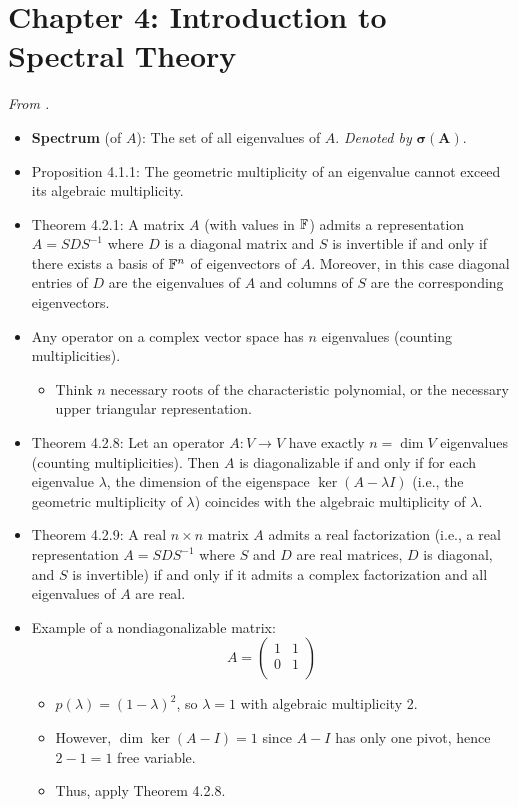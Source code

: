 \documentclass[../../notes.tex]{subfiles}
\begin{document}
\section{Chapter 4: Introduction to Spectral Theory}
\emph{From \textcite{bib:Treil}.}
\begin{itemize}
    \item {}\textbf{Spectrum} (of $A$): The set of all eigenvalues of $A$. \emph{Denoted by} $\bm{\sigma(A)}$.
    \item Proposition 4.1.1: The geometric multiplicity of an eigenvalue cannot exceed its algebraic multiplicity.
    \item Theorem 4.2.1: A matrix $A$ (with values in $\mathbb{F}$) admits a representation $A=SDS^{-1}$ where $D$ is a diagonal matrix and $S$ is invertible if and only if there exists a basis of $\mathbb{F}^n$ of eigenvectors of $A$. Moreover, in this case diagonal entries of $D$ are the eigenvalues of $A$ and columns of $S$ are the corresponding eigenvectors.
    \item Any operator on a complex vector space has $n$ eigenvalues (counting multiplicities).
    \begin{itemize}
        \item Think $n$ necessary roots of the characteristic polynomial, or the necessary upper triangular representation.
    \end{itemize}
    \item Theorem 4.2.8: Let an operator $A:V\to V$ have exactly $n=\dim V$ eigenvalues (counting multiplicities). Then $A$ is diagonalizable if and only if for each eigenvalue $\lambda$, the dimension of the eigenspace $\ker(A-\lambda I)$ (i.e., the geometric multiplicity of $\lambda$) coincides with the algebraic multiplicity of $\lambda$.
    \item Theorem 4.2.9: A real $n\times n$ matrix $A$ admits a real factorization (i.e., a real representation $A=SDS^{-1}$ where $S$ and $D$ are real matrices, $D$ is diagonal, and $S$ is invertible) if and only if it admits a complex factorization and all eigenvalues of $A$ are real.
    \item Example of a nondiagonalizable matrix:
    \begin{equation*}
        A =
        \begin{pmatrix}
            1 & 1\\
            0 & 1\\
        \end{pmatrix}
    \end{equation*}
    \begin{itemize}
        \item $p(\lambda)=(1-\lambda)^2$, so $\lambda=1$ with algebraic multiplicity 2.
        \item However, $\dim\ker(A-I)=1$ since $A-I$ has only one pivot, hence $2-1=1$ free variable.
        \item Thus, apply Theorem 4.2.8.
    \end{itemize}
\end{itemize}
\end{document}
